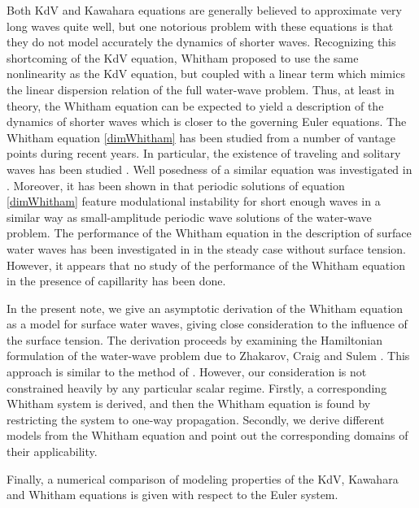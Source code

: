 Both KdV and Kawahara equations are generally believed to approximate
very long waves quite well,
but one notorious problem with these equations is that they do not model
accurately the dynamics of shorter waves.
Recognizing this shortcoming of the KdV equation, Whitham proposed to use
the same nonlinearity as the KdV equation, but coupled with a linear term
which mimics the linear dispersion relation of the full water-wave problem.
Thus, at least in theory, 
the Whitham equation can be expected to yield a 
description of the dynamics of shorter waves which is closer to
the governing Euler equations.
The Whitham equation \eqref{dimWhitham} has been studied from
a number of vantage points during recent years.
In particular, the existence of traveling and solitary waves
has been studied  \citep{Minzoni2013, Ehrnstrom2012, Ehrnstrom2009, Ehrnstrom2013}.
Well posedness of a similar equation
was investigated in \cite{Lannes2013}.
Moreover, it has been shown
in \citep{Hur2015, Hur2015104,Sanford2014}
that periodic solutions of equation \eqref{dimWhitham}
feature modulational instability 
for short enough waves in a similar way as small-amplitude periodic wave
solutions of the water-wave problem. 
The performance of the Whitham equation in the description of surface water
waves has been investigated in \cite{BKN} in the steady case without surface tension.
However, it appears that no study of the performance of the Whitham equation
in the presence of capillarity has been done.

In the present note, we give an asymptotic derivation of the Whitham equation
as a model for surface water waves, 
giving close consideration to the influence of the surface tension.
The derivation proceeds by examining the Hamiltonian
formulation of the water-wave problem due to Zhakarov, Craig and Sulem \cite{Zakharov1968, Craig1993}.
This approach is similar to the method of \cite{Craig1994}.
However, our consideration is not constrained heavily
by any particular scalar regime.
Firstly, a corresponding Whitham system is derived, and then the Whitham
equation is found by restricting the system to one-way propagation.
Secondly, we derive different models from the Whitham equation
and point out the corresponding domains of their applicability.

Finally, a numerical comparison of modeling properties
of the KdV, Kawahara and Whitham equations is given
with respect to the Euler system. 


